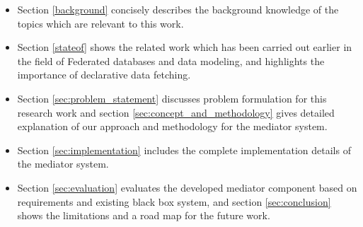 		\begin{itemize}
			\item Section \ref{background} concisely describes the background knowledge of the topics which are relevant to this work.
			\item Section \ref{stateof} shows the related work which has been carried out earlier in the field of Federated databases and data modeling, and highlights the importance of declarative data fetching.
			\item Section \ref{sec:problem_statement} discusses problem formulation for this research work and section \ref{sec:concept_and_methodology} gives detailed explanation of our approach and methodology for the mediator system.
			\item Section \ref{sec:implementation} includes the complete implementation details of the mediator system.
			\item Section \ref{sec:evaluation} evaluates the developed mediator component based on requirements and existing black box system, and section \ref{sec:conclusion} shows the limitations and a road map for the future work. 
		\end{itemize}

\let\cleardoublepage\clearpage

